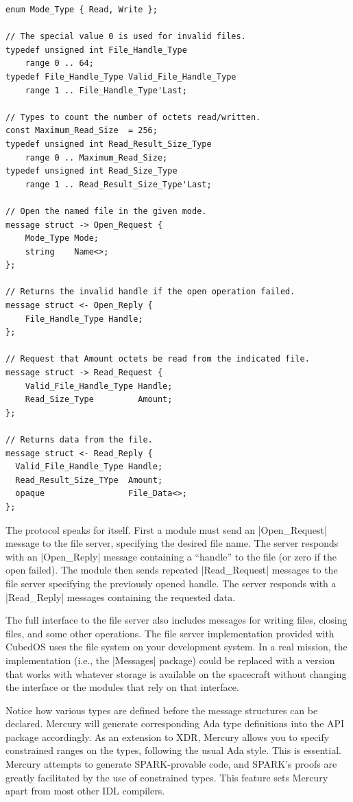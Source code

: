 \begin{verbatim}
enum Mode_Type { Read, Write };

// The special value 0 is used for invalid files.
typedef unsigned int File_Handle_Type
    range 0 .. 64;
typedef File_Handle_Type Valid_File_Handle_Type
    range 1 .. File_Handle_Type'Last;
  
// Types to count the number of octets read/written.
const Maximum_Read_Size  = 256;
typedef unsigned int Read_Result_Size_Type
    range 0 .. Maximum_Read_Size;
typedef unsigned int Read_Size_Type
    range 1 .. Read_Result_Size_Type'Last;
  
// Open the named file in the given mode.
message struct -> Open_Request {
    Mode_Type Mode;
    string    Name<>;
};
  
// Returns the invalid handle if the open operation failed.
message struct <- Open_Reply {
    File_Handle_Type Handle;
};
  
// Request that Amount octets be read from the indicated file.
message struct -> Read_Request {
    Valid_File_Handle_Type Handle;
    Read_Size_Type         Amount;
};

// Returns data from the file.
message struct <- Read_Reply {
  Valid_File_Handle_Type Handle;
  Read_Result_Size_TYpe  Amount;
  opaque                 File_Data<>;
};
\end{verbatim}

The protocol speaks for itself. First a module must send an |Open_Request| message to the file
server, specifying the desired file name. The server responds with an |Open_Reply| message
containing a ``handle'' to the file (or zero if the open failed). The module then sends repeated
|Read_Request| messages to the file server specifying the previously opened handle. The server
responds with a |Read_Reply| messages containing the requested data.

The full interface to the file server also includes messages for writing files, closing files,
and some other operations. The file server implementation provided with CubedOS uses the file
system on your development system. In a real mission, the implementation (i.e., the |Messages|
package) could be replaced with a version that works with whatever storage is available on the
spacecraft without changing the interface or the modules that rely on that interface.

Notice how various types are defined before the message structures can be declared. Mercury will
generate corresponding Ada type definitions into the API package accordingly. As an extension to
XDR, Mercury allows you to specify constrained ranges on the types, following the usual Ada
style. This is essential. Mercury attempts to generate SPARK-provable code, and SPARK's proofs
are greatly facilitated by the use of constrained types. This feature sets Mercury apart from
most other IDL compilers.

